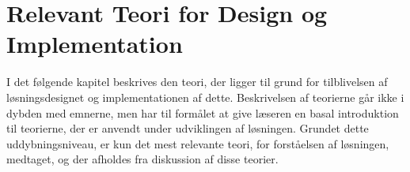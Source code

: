 \chapter{Relevant Teori for Design og Implementation}

I det følgende kapitel beskrives den teori, der ligger til grund for tilblivelsen af løsningsdesignet og implementationen af dette. Beskrivelsen af teorierne går ikke i dybden med emnerne, men har til formålet at give læseren en basal introduktion til teorierne, der er anvendt under udviklingen af løsningen. Grundet dette uddybningsniveau, er kun det mest relevante teori, for forståelsen af løsningen, medtaget, og der afholdes fra diskussion af disse teorier.







